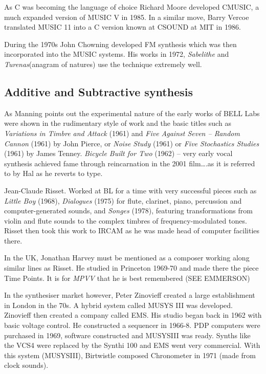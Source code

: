 As C was becoming the language of choice Richard Moore developed CMUSIC, a much expanded version of MUSIC V in 1985.  In a similar move, Barry Vercoe translated MUSIC 11 into a C version known at CSOUND at MIT in 1986.

During the 1970s John Chowning  developed FM synthesis which was then incorporated into the MUSIC systems.  His works in 1972, \textit{Sabelithe} and \textit{Turenas}(anagram of natures) use the technique extremely well.

\subsection{Additive and Subtractive synthesis}

As Manning points out the experimental nature of the early works of BELL Labs were shown in the rudimentary style of work and the basic titles such as \textit{Variations in Timbre and Attack} (1961) and \textit{Five Against Seven – Random Cannon} (1961) by John Pierce, or \textit{Noise Study} (1961) or \textit{Five Stochastics Studies} (1961) by James Tenney.  \textit{Bicycle Built for Two} (1962) – very early vocal synthesis achieved fame through reincarnation in the 2001 film….as it is referred to by Hal as he reverts to type. 

Jean-Claude Risset. Worked at BL for a time with very successful pieces such as \textit{Little Boy} (1968), \textit{Dialogues} (1975) for flute, clarinet, piano, percussion and computer-generated sounds, and \textit{Songes} (1978), featuring transformations from violin and flute sounds to the complex timbres of frequency-modulated tones.  Risset then took this work to IRCAM as he was made head of computer facilities there. 

In the UK, Jonathan Harvey must be mentioned as a composer working along similar lines as Risset. He studied in Princeton 1969-70 and made there the piece Time Points.  It is for \textit{MPVV} that he is best remembered (SEE EMMERSON)

In the synthesiser market however, Peter Zinovieff created a large establishment in London in the 70s.  A hybrid system called MUSYS III was developed. Zinovieff then created a company called EMS.  His studio began back in 1962 with basic voltage control.  He constructed a sequencer in 1966-8.  PDP computers were purchased in 1969, software constructed and MUSYSIII was ready.  Synths like the VCS4 were replaced by the Synthi 100 and EMS went very commercial.  With this system (MUSYSIII), Birtwistle composed Chronometer in 1971 (made from clock sounds).




